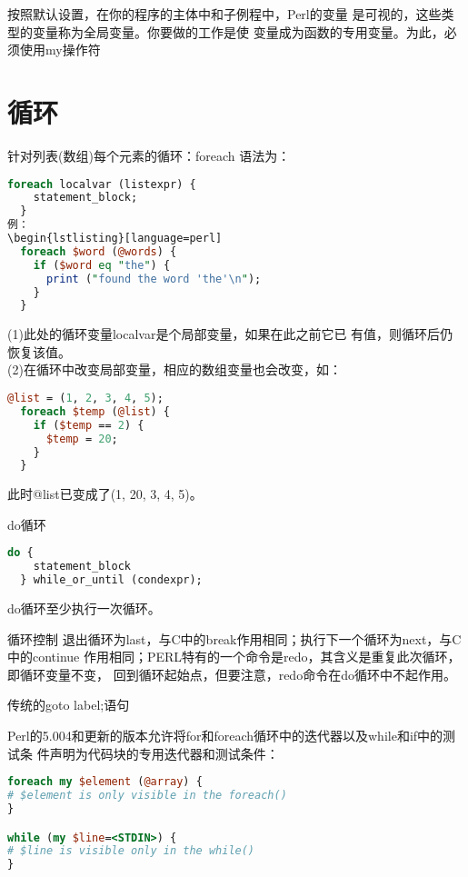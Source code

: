 \documentclass[a4paper,11pt]{book}
\begin{document}
按照默认设置，在你的程序的主体中和子例程中，Perl的变量
是可视的，这些类型的变量称为全局变量。你要做的工作是使
变量成为函数的专用变量。为此，必须使用my操作符

\section{循环}
\begin{description*}
    \item[针对列表(数组)每个元素的循环：foreach] 语法为：
\begin{lstlisting}[language=perl]
  foreach localvar (listexpr) {
    statement_block;
  }
例：
\begin{lstlisting}[language=perl]
  foreach $word (@words) {
    if ($word eq "the") {
      print ("found the word 'the'\n"); 
    }
  }
\end{lstlisting}
(1)此处的循环变量localvar是个局部变量，如果在此之前它已
有值，则循环后仍恢复该值。\\
(2)在循环中改变局部变量，相应的数组变量也会改变，如：
\begin{lstlisting}[language=perl]
  @list = (1, 2, 3, 4, 5);
  foreach $temp (@list) {
    if ($temp == 2) {
      $temp = 20;
    }
  }
\end{lstlisting}
此时@list已变成了(1, 20, 3, 4, 5)。
\item [do循环]
\begin{lstlisting}[language=perl]
  do {
    statement_block
  } while_or_until (condexpr);
\end{lstlisting}
  do循环至少执行一次循环。
\item [循环控制] 
  退出循环为last，与C中的break作用相同；执行下一个循环为next，与C中的continue
  作用相同；PERL特有的一个命令是redo，其含义是重复此次循环，即循环变量不变，
  回到循环起始点，但要注意，redo命令在do循环中不起作用。
\item [传统的goto label;语句]
\end{description*}

Perl的5.004和更新的版本允许将for和foreach循环中的迭代器以及while和if中的测试条
件声明为代码块的专用迭代器和测试条件：
\begin{lstlisting}[language=perl]
foreach my $element (@array) {
# $element is only visible in the foreach()
}

while (my $line=<STDIN>) {
# $line is visible only in the while()
}
\end{lstlisting}
\end{document}
